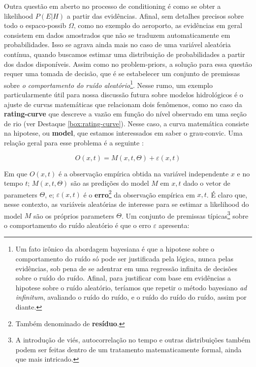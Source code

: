 \documentclass[./main.tex]{subfiles}
\begin{document}
\par Outra questão em aberto no processo de \gls{conditioning} é como se obter a \gls{likelihood} $P(E | H)$ a partir das evidências. Afinal, sem detalhes precisos sobre todo o \gls{espaco-possib} $\Omega$, como no exemplo do aeroporto, as evidências em geral consistem em dados amostrados que não se traduzem automaticamente em probabilidades. Isso se agrava ainda mais no caso de uma variável aleatória contínua, quando buscamos estimar uma distribuição de probabilidades a partir dos dados disponíveis. Assim como no \gls{problem-priors}, a solução para essa questão requer uma tomada de decisão, que é se estabelecer um conjunto de premissas sobre \textit{o comportamento do ruído aleatório}\footnote{Um fato irônico da abordagem bayesiana é que a \gls{hipotese} sobre o comportamento do ruído só pode ser justificada pela lógica, nunca pelas evidências, sob pena de se adentrar em uma regressão infinita de decisões sobre o ruído do ruído. Afinal, para justificar com base em evidências a \gls{hipotese} sobre o ruído aleatório, teríamos que repetir o método bayesiano \textit{ad infinitum}, avaliando o ruído do ruído, e o ruído do ruído do ruído, assim por diante.}. Nesse rumo, um exemplo particularmente útil para nossa discussão futura sobre modelos hidrológicos é o ajuste de curvas matemáticas que relacionam dois fenômenos, como no caso da \textbf{\gls{rating-curve}} que descreve a vazão em função do nível observado em uma seção de rio (ver Destaque \ref{box:rating-curve}).  Nesse caso, a curva matemática consiste na \gls{hipotese}, ou \textbf{\gls{model}}, que estamos interessados em saber o \gls{grau-convic}.  Uma relação geral para esse problema é a seguinte \cite{Box1979}:
\begin{linenomath*}
\begin{equation}
\label{eq:bayes-model}
    O(x, t) = M(x, t, \Theta) + \varepsilon(x, t)
\end{equation}
\end{linenomath*}
Em que $O(x, t)$ é a observação empírica obtida na variável independente $x$ e no tempo $t$; $M(x, t, \Theta)$ são as predições do \gls{model} $M$ em $x,t$ dado o vetor de \gls{parameters} $\Theta$, e; $\varepsilon(x, t)$ é o \textbf{erro}\footnote{Também denominado de \textbf{resíduo}.} da observação empírica em $x,t$. É claro que, nesse contexto, as variáveis aleatórias de interesse para se estimar a \gls{likelihood} do \gls{model} $M$ são os próprios \gls{parameters} $\Theta$. Um conjunto de premissas típicas\footnote{A introdução de viés, autocorrelação no tempo e outras distribuições também podem ser feitas dentro de um tratamento matematicamente formal, ainda que mais intricado.} sobre o comportamento do ruído aleatório é que o erro $\varepsilon$ apresenta:
\end{document}
